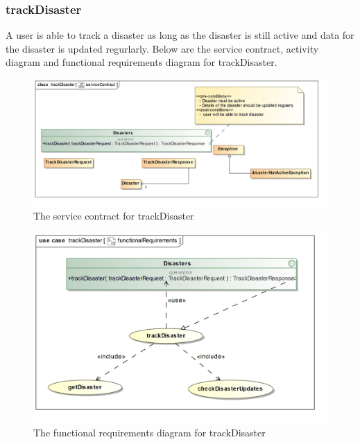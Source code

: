 \subsubsection{trackDisaster}

A user is able to track a disaster as long as the disaster is still active and data for the disaster is updated regurlarly. Below are the service contract, activity diagram and functional requirements diagram for trackDisaster.

\begin{figure}[H]
	\centering
	\includegraphics[scale=0.21]{../images/funcReq/trackDisasterServiceContract.jpg}
	\caption{The service contract for trackDisaster \label{overflow}}
\end{figure}

\begin{figure}[H]
	\centering
	\includegraphics[width=1.2\textwidth]{../images/funcReq/trackDisasterFunctionalRequirements.jpg}
	\caption{The functional requirements diagram for trackDisaster \label{overflow}}
\end{figure}

